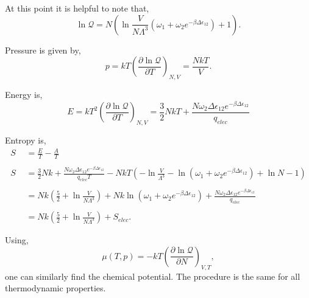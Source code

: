 At this point it is helpful to note that,
\begin{equation*}
	\ln{\mathcal{Q}} = N\left(\ln{\frac{V}{N\Lambda^{3}}}(\omega_1 +
		\omega_2e^{-\beta\Delta\epsilon_{12}}) +1 \right).
\end{equation*}

Pressure is given by,
\begin{equation*}
	p = kT\left(\frac{\partial \ln{\mathcal{Q}}}{\partial T}\right)_{N,V} =
	\frac{NkT}{V}.
\end{equation*}

Energy is,
\begin{equation*}
	E = kT^2 \left(\frac{\partial \ln{\mathcal{Q}}}{\partial T}\right)_{N,V} =
	\frac{3}{2}NkT + \frac{N\omega_2\Delta\epsilon_{12}
	e^{-\beta\Delta\epsilon_{12}}} {q_{elec}}
\end{equation*}

Entropy is,
\begin{align*}
	S &= \frac{E}{T} - \frac{A}{T}\\
	\quad\\
	S &= \frac{3}{2}Nk + \frac{N\omega_2\Delta\epsilon_{12}
	e^{-\beta\Delta\epsilon_{12}}}{q_{elec}T} - NkT\left(
	-\ln{\frac{V}{\Lambda^{3}}} -\ln{(\omega_1 +
	\omega_2e^{-\beta\Delta\epsilon_{12}})} +\ln{N} - 1 \right)\\
	\quad\\
	  &= Nk\left( \frac{5}{2} + \ln{\frac{V}{N\Lambda^{3}}}\right) + Nk\ln(\omega_1 +
		\omega_2e^{-\beta\Delta\epsilon_{12}}) + \frac{N\omega_2\Delta\epsilon_{12}
		e^{-\beta\Delta\epsilon_{12}}} {q_{elec}}\\
	\quad\\
	  &= Nk\left( \frac{5}{2} + \ln{\frac{V}{N\Lambda^{3}}}\right) + S_{elec}.
\end{align*}

Using,
\begin{equation*}
	\mu(T, p) = -kT \left(\frac{\partial \ln{\mathcal{Q}}}{\partial
	N}\right)_{V,T},
\end{equation*}
one can similarly find the chemical potential. The procedure is the same for
all thermodynamic properties.
